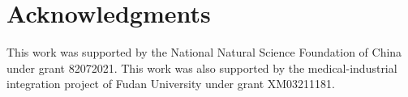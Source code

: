 \documentclass[lettersize,journal]{IEEEtran}
\begin{document}





\section*{Acknowledgments}
This work was supported by the National Natural Science Foundation of China under grant 82072021. This work was also supported by the medical-industrial integration project of Fudan University under grant XM03211181.







 
\end{document}
